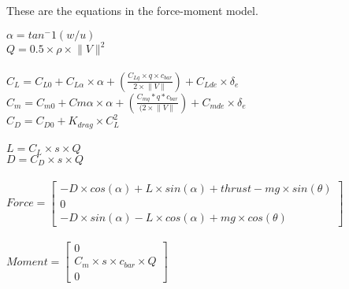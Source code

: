 \documentclass{article}
\begin{document}
These are the equations in the force-moment model.

$\alpha = tan^-1 (w/u) $
\\
$Q = 0.5 \times \rho \times \lVert V \rVert ^2 $
\\\\
$C_{L} = C_{L0} + C_{L \alpha} \times \alpha + (\frac{C_{Lq} \times q \times c_{bar}}{2 \times \lVert V \rVert}) + C_{Lde} \times \delta_{e}  $
\\
$C_{m} = C_{m0} + C{m \alpha} \times \alpha +(\frac{C_{mq}*q*c_{bar}}{(2 \times \lVert V \rVert})+C_{mde} \times \delta_{e}$
\\
$C_{D}  = C_{D0} + K_{drag} \times C_{L} ^2$
\\ \\
$L = C_{L} \times s \times Q$
\\ 
$D = C_{D} \times s \times Q$
\\ \\
$Force = \left[ \begin{array}{c} -D \times cos(\alpha)+L \times sin(\alpha)+ thrust - mg \times sin(\theta)\\0 \\ -D \times sin(\alpha)-L \times cos(\alpha)+mg \times cos(\theta) \end{array} \right]$
\\ \\
$Moment  = \left[ \begin{array}{c} 0\\C_{m} \times s\times c_{bar} \times Q \\ 0 \end{array} \right]$

 
\end{document}
